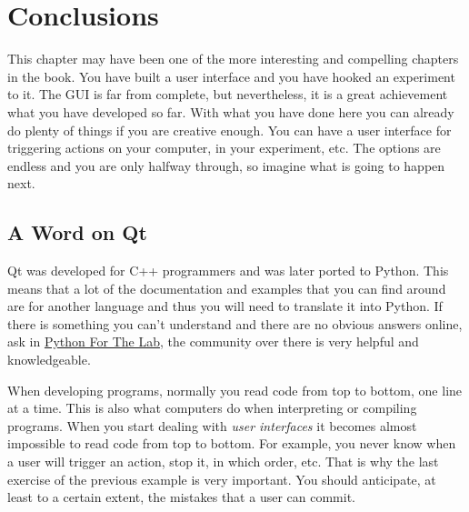 


\section{Conclusions}\label{conclusions}
This chapter may have been one of the more interesting and compelling
chapters in the book. You have built a user interface and you have
hooked an experiment to it. The {GUI} is far from complete, but
nevertheless, it is a great achievement what you have developed so far.
With what you have done here you can already do plenty of things if you
are creative enough. You can have a user interface for triggering
actions on your computer, in your experiment, etc. The options are
endless and you are only halfway through, so imagine what is going to
happen next.

\subsection{A Word on Qt}\label{a-word-onqt}
Qt was developed for C++ programmers and was later ported to Python.
This means that a lot of the documentation and examples that you can
find around are for another language and thus you will need to translate
it into Python. If there is something you can't understand and there are
no obvious answers online, ask in
\href{https://forum.pythonforthelab.com}{Python For The Lab}, the community over there is very helpful and knowledgeable.

When developing programs, normally you read code from top to bottom, one
line at a time. This is also what computers do when interpreting or
compiling programs. When you start dealing with \emph{user interfaces}
it becomes almost impossible to read code from top to bottom. For
example, you never know when a user will trigger an action, stop it, in
which order, etc. That is why the last exercise of the previous example
is very important. You should anticipate, at least to a certain extent,
the mistakes that a user can commit.

